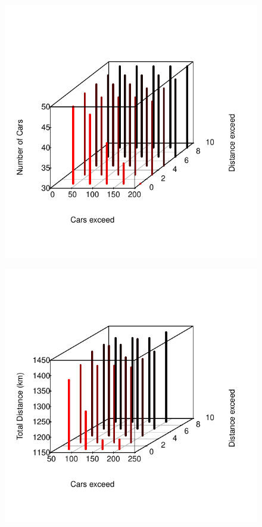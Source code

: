 \documentclass[12]{article}
\begin{document}
\begin{figure}[H]
  \captionsetup{justification=centering}
   \centering
    \includegraphics[scale=0.8]{Results/data_5_2.pdf}
      \caption{}
      \label{fig:data_5_2}
  \end{figure}
    \vspace{1cm}

\begin{figure}[H]
  \captionsetup{justification=centering}
   \centering
    \includegraphics[scale=0.8]{Results/data_5_3.pdf}
      \caption{}
      \label{fig:data_5_3}
  \end{figure}
    \vspace{1cm}
\end{document}
